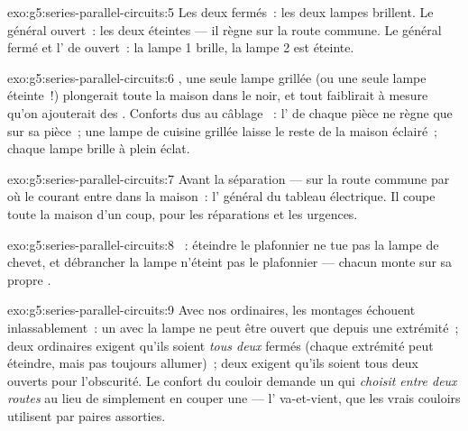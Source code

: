 \begin{solution}{exo:g5:series-parallel-circuits:5}
Les deux fermés~: les deux lampes brillent. Le général ouvert~: les
deux éteintes --- il règne sur la route commune. Le général fermé et
l' de  ouvert~: la lampe 1 brille, la lampe 2 est
éteinte.
\end{solution}

\begin{solution}{exo:g5:series-parallel-circuits:6}
, une seule lampe grillée (ou une seule lampe éteinte~!)
plongerait toute la maison dans le noir, et tout faiblirait à mesure
qu'on ajouterait des . Conforts dus au câblage ~: l' de chaque pièce ne règne que sur sa
pièce~; une lampe de cuisine grillée laisse le reste de la maison
éclairé~; chaque lampe brille à plein éclat.
\end{solution}

\begin{solution}{exo:g5:series-parallel-circuits:7}
Avant la séparation --- sur la route commune par où le courant entre
dans la maison~: l' général du tableau électrique. Il
coupe toute la maison d'un coup, pour les réparations et les
urgences.
\end{solution}

\begin{solution}{exo:g5:series-parallel-circuits:8}
~: éteindre le plafonnier ne tue pas la lampe de chevet,
et débrancher la lampe n'éteint pas le plafonnier --- chacun monte
sur sa propre .
\end{solution}

\begin{solution}{exo:g5:series-parallel-circuits:9}
Avec nos  ordinaires, les montages échouent
inlassablement~: un   avec la lampe ne peut être
ouvert que depuis une extrémité~; deux  ordinaires  exigent qu'ils soient \emph{tous deux} fermés (chaque extrémité
peut éteindre, mais pas toujours allumer)~; deux 
exigent qu'ils soient tous deux ouverts pour l'obscurité. Le confort
du couloir demande un  qui \emph{choisit entre deux
routes} au lieu de simplement en couper une --- l'
va-et-vient, que les vrais couloirs utilisent par paires assorties.
\end{solution}

